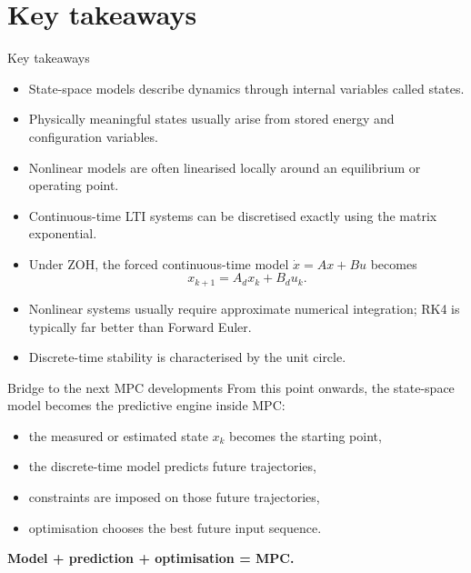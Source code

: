 \documentclass[aspectratio=169,10pt]{beamer}
\begin{document}
\section{Key takeaways}

\begin{frame}{Key takeaways}
\begin{itemize}
  \item State-space models describe dynamics through internal variables called states.
  \item Physically meaningful states usually arise from stored energy and configuration variables.
  \item Nonlinear models are often linearised locally around an equilibrium or operating point.
  \item Continuous-time LTI systems can be discretised exactly using the matrix exponential.
  \item Under ZOH, the forced continuous-time model \(\dot{x}=Ax+Bu\) becomes
  \[
  x_{k+1}=A_d x_k + B_d u_k.
  \]
  \item Nonlinear systems usually require approximate numerical integration; RK4 is typically far better than Forward Euler.
  \item Discrete-time stability is characterised by the unit circle.
\end{itemize}
\end{frame}

\begin{frame}{Bridge to the next MPC developments}
From this point onwards, the state-space model becomes the predictive engine inside MPC:
\begin{itemize}
  \item the measured or estimated state \(x_k\) becomes the starting point,
  \item the discrete-time model predicts future trajectories,
  \item constraints are imposed on those future trajectories,
  \item optimisation chooses the best future input sequence.
\end{itemize}

\begin{center}
\textbf{Model + prediction + optimisation = MPC.}
\end{center}
\end{frame}
\end{document}
